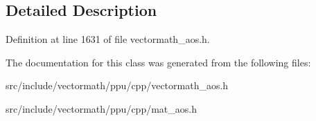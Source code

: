 \subsection{Detailed Description}


Definition at line 1631 of file vectormath\-\_\-aos.\-h.



The documentation for this class was generated from the following files\-:\begin{DoxyCompactItemize}
\item 
src/include/vectormath/ppu/cpp/vectormath\-\_\-aos.\-h\item 
src/include/vectormath/ppu/cpp/mat\-\_\-aos.\-h\end{DoxyCompactItemize}
